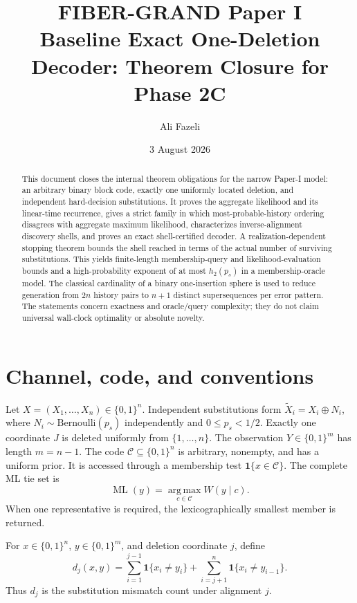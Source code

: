 \documentclass[11pt]{article}
\title{FIBER-GRAND Paper I\\Baseline Exact One-Deletion Decoder: Theorem Closure for Phase 2C}
\author{Ali Fazeli}
\date{3 August 2026}
\theoremstyle{remark}
\newcommand{\C}{\mathcal C}
\newcommand{\one}{\mathbf 1}
\newcommand{\argmax}{\operatorname*{arg\,max}}
\newcommand{\ML}{\operatorname{ML}}
\begin{document}
\maketitle

\begin{abstract}
This document closes the internal theorem obligations for the narrow Paper-I model: an arbitrary
binary block code, exactly one uniformly located deletion, and independent hard-decision
substitutions.  It proves the aggregate likelihood and its linear-time recurrence, gives a strict
family in which most-probable-history ordering disagrees with aggregate maximum likelihood,
characterizes inverse-alignment discovery shells, and proves an exact shell-certified decoder.
A realization-dependent stopping theorem bounds the shell reached in terms of the actual number of
surviving substitutions.  This yields finite-length membership-query and likelihood-evaluation
bounds and a high-probability exponent of at most $h_2(p_s)$ in a membership-oracle model.  The
classical cardinality of a binary one-insertion sphere is used to reduce generation from $2n$
history pairs to $n+1$ distinct supersequences per error pattern.  The statements concern exactness
and oracle/query complexity; they do not claim universal wall-clock optimality or absolute novelty.
\end{abstract}

\section{Channel, code, and conventions}
Let $X=(X_1,\ldots,X_n)\in\{0,1\}^n$.  Independent substitutions form
$\widetilde X_i=X_i\oplus N_i$, where $N_i\sim\mathrm{Bernoulli}(p_s)$ independently and
$0\le p_s<1/2$. Exactly one coordinate $J$ is deleted uniformly from
$\{1,\ldots,n\}$.  The observation $Y\in\{0,1\}^{m}$ has length $m=n-1$.
The code $\C\subseteq\{0,1\}^n$ is arbitrary, nonempty, and has a uniform prior.  It is accessed
through a membership test $\one\{x\in\C\}$.  The complete ML tie set is
\[
 \ML(y)=\argmax_{c\in\C} W(y\mid c).
\]
When one representative is required, the lexicographically smallest member is returned.

For $x\in\{0,1\}^n$, $y\in\{0,1\}^{m}$, and deletion coordinate $j$, define
\begin{equation}
 d_j(x,y)=\sum_{i=1}^{j-1}\one\{x_i\ne y_i\}
 +\sum_{i=j+1}^{n}\one\{x_i\ne y_{i-1}\}.
 \label{eq:dj}
\end{equation}
Thus $d_j$ is the substitution mismatch count under alignment $j$.
\end{document}
